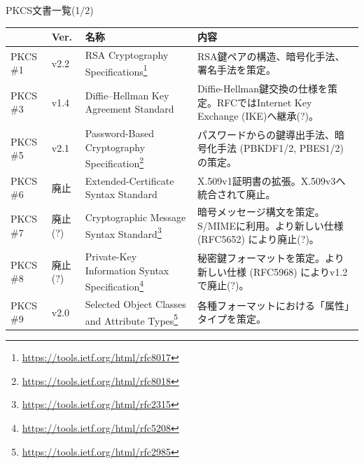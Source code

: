 \documentclass[12pt,dvipdfmx]{beamer}
\begin{document}
\begin{frame}
PKCS文書一覧(1/2)
\begin{table}
\scriptsize
\begin{tabular}{|l|l|p{21ex}|p{40ex}|}
\hline
 & Ver. & 名称 & 内容 \\
\hline\hline
PKCS \#1 & v2.2 & RSA Cryptography Specifications\footnote[frame]{\scriptsize \url{https://tools.ietf.org/html/rfc8017}} & RSA鍵ペアの構造、暗号化手法、署名手法を策定。\\
\hline
PKCS \#3 & v1.4 & Diffie–Hellman Key Agreement Standard & Diffie-Hellman鍵交換の仕様を策定。RFCではInternet Key Exchange (IKE)へ継承(?)。\\
\hline
PKCS \#5 & v2.1 & Password-Based Cryptography Specification\footnote[frame]{\scriptsize \url{https://tools.ietf.org/html/rfc8018}} & パスワードからの鍵導出手法、暗号化手法 (PBKDF1/2, PBES1/2) の策定。\\
\hline
PKCS \#6 & 廃止 & Extended-Certificate Syntax Standard & X.509v1証明書の拡張。X.509v3へ統合されて廃止。\\
\hline
PKCS \#7 & 廃止(?) & Cryptographic Message Syntax Standard\footnote[frame]{\scriptsize \url{https://tools.ietf.org/html/rfc2315}} & 暗号メッセージ構文を策定。S/MIMEに利用。より新しい仕様 (RFC5652) により廃止(?)。\\
\hline
PKCS \#8 & 廃止(?) & Private-Key Information Syntax Specification\footnote[frame]{\scriptsize \url{https://tools.ietf.org/html/rfc5208}} & 秘密鍵フォーマットを策定。より新しい仕様 (RFC5968) によりv1.2で廃止(?)。\\
\hline
PKCS \#9 & v2.0 & Selected Object Classes and Attribute Types\footnote[frame]{\scriptsize \url{https://tools.ietf.org/html/rfc2985}} & 各種フォーマットにおける「属性」タイプを策定。\\
\hline
\end{tabular}
\end{table}
\end{frame}
\end{document}
